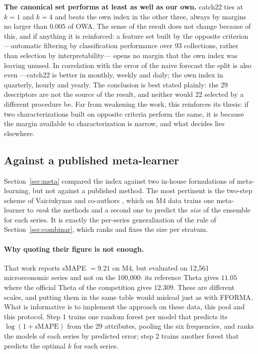 \textbf{The canonical set performs at least as well as our own.} catch22 ties at $k=1$ and
$k=4$ and beats the own index in the other three, always by margins no larger than $0.005$
of OWA. The sense of the result does not change because of this, and if anything it is
reinforced: a feature set built by the opposite criterion ---automatic filtering by
classification performance over 93 collections, rather than selection by
interpretability--- opens no margin that the own index was leaving unused. In correlation
with the error of the naive forecast the split is also even ---catch22 is better in
monthly, weekly and daily; the own index in quarterly, hourly and yearly. The conclusion
is best stated plainly: the 29 descriptors are not the source of the result, and neither
would 22 selected by a different procedure be. Far from weakening the work, this
reinforces its thesis: if two characterizations built on opposite criteria perform the
same, it is because the margin available to characterization is narrow, and what decides
lies elsewhere.

\subsection{Against a published meta-learner}\label{sec:dospasos}

Section~\ref{sec:meta} compared the index against two in-house formulations of
meta-learning, but not against a published method. The most pertinent is the two-step
scheme of Vaiciukynas and co-authors \cite{vaiciukynas2021}, which on M4 data trains one
meta-learner to \emph{rank} the methods and a second one to predict the \emph{size} of the
ensemble for each series. It is exactly the per-series generalization of the rule of
Section~\ref{sec:combinar}, which ranks and fixes the size per stratum.

\paragraph{Why quoting their figure is not enough.} That work reports sMAPE $=9.21$ on M4,
but evaluated on 12{,}561 microeconomic series and not on the 100{,}000: its reference
Theta gives $11.05$ where the official Theta of the competition gives $12.309$. These are
different scales, and putting them in the same table would mislead just as with FFORMA.
What is informative is to implement the approach on these data, this pool and this
protocol. Step 1 trains one random forest per model that predicts its
$\log(1+\mathrm{sMAPE})$ from the 29 attributes, pooling the six frequencies, and ranks
the models of each series by predicted error; step 2 trains another forest that predicts
the optimal $k$ for each series.

